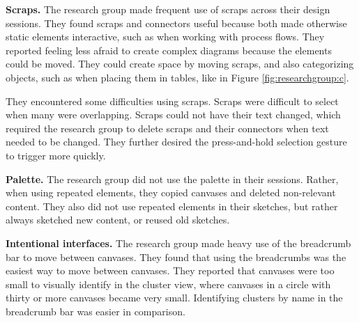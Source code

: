 \textbf{Scraps.} The research group made frequent use of scraps across their design sessions. They found scraps and connectors useful because both made otherwise static elements interactive, such as when working with process flows. They reported feeling less afraid to create complex diagrams because the elements could be moved.  They could create space by moving scraps, and also categorizing objects, such as when placing them in tables, like in Figure \ref{fig:researchgroup:c}. 

They encountered some difficulties using scraps. Scraps were difficult to select when many were overlapping. Scraps could not have their text changed, which required the research group to delete scraps and their connectors when text needed to be changed. They further desired the press-and-hold selection gesture to trigger more quickly.
%
%
%
%
%
%
%

\textbf{Palette.} The research group did not use the palette in their sessions. Rather, when using repeated elements, they copied canvases and deleted non-relevant content. They also did not use repeated elements in their sketches, but rather always sketched new content, or reused old sketches.

\textbf{Intentional interfaces.} The research group made heavy use of the breadcrumb bar to move between canvases. They found that using the breadcrumbs was the easiest way to move between canvases. They reported that canvases were too small to visually identify in the cluster view, where canvases in a circle with thirty or more canvases became very small. Identifying clusters by name in the breadcrumb bar was easier in comparison.

